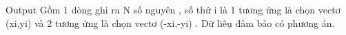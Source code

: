 Output
Gồm 1 dòng ghi ra N số nguyên , số thứ i là 1 tương ứng là chọn vectơ (xi,yi) và 2 tương ứng là chọn vectơ (-xi,-yi) . Dữ liêụ đảm bảo có phương án.
